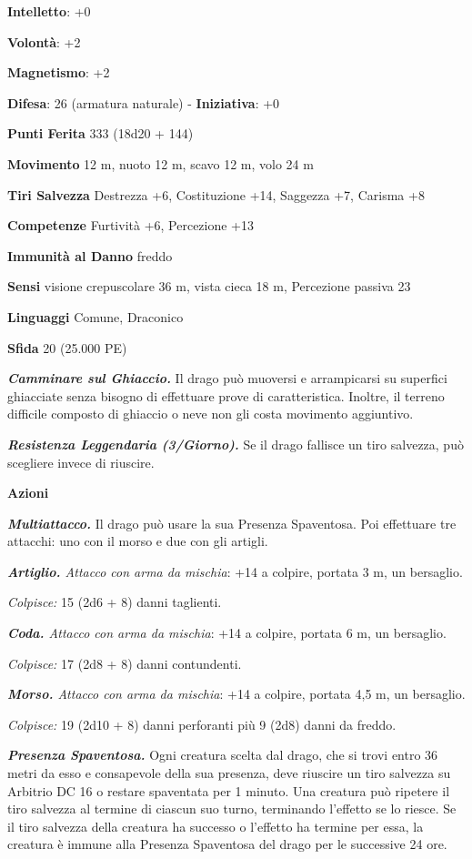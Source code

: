 \begin{multicols}{2}
\textbf{Intelletto}: +0

\textbf{Volontà}: +2

\textbf{Magnetismo}: +2

\textbf{Difesa}: 26 (armatura naturale) - \textbf{Iniziativa}: +0

\textbf{Punti Ferita} 333 (18d20 + 144)

\textbf{Movimento} 12 m, nuoto 12 m, scavo 12 m, volo 24 m

\textbf{Tiri Salvezza} Destrezza +6, Costituzione +14, Saggezza +7,
Carisma +8

\textbf{Competenze} Furtività +6, Percezione +13

\textbf{Immunità al Danno} freddo

\textbf{Sensi} visione crepuscolare 36 m, vista cieca 18 m, Percezione passiva
23

\textbf{Linguaggi} Comune, Draconico

\textbf{Sfida} 20 (25.000 PE)

\emph{\textbf{Camminare sul Ghiaccio.}} Il drago può muoversi e
arrampicarsi su superfici ghiacciate senza bisogno di effettuare prove
di caratteristica. Inoltre, il terreno difficile composto di ghiaccio o
neve non gli costa movimento aggiuntivo.

\emph{\textbf{Resistenza Leggendaria (3/Giorno).}} Se il drago fallisce
un tiro salvezza, può scegliere invece di riuscire.

\textbf{Azioni}

\emph{\textbf{Multiattacco.}} Il drago può usare la sua Presenza
Spaventosa. Poi effettuare tre attacchi: uno con il morso e due con gli
artigli.

\emph{\textbf{Artiglio.} Attacco con arma da mischia}: +14 a colpire,
portata 3 m, un bersaglio.

\emph{Colpisce:} 15 (2d6 + 8) danni taglienti.

\emph{\textbf{Coda.} Attacco con arma da mischia}: +14 a colpire,
portata 6 m, un bersaglio.

\emph{Colpisce:} 17 (2d8 + 8) danni contundenti.

\emph{\textbf{Morso.} Attacco con arma da mischia}: +14 a colpire,
portata 4,5 m, un bersaglio.

\emph{Colpisce:} 19 (2d10 + 8) danni perforanti più 9 (2d8) danni da
freddo.

\emph{\textbf{Presenza Spaventosa.}} Ogni creatura scelta dal drago, che
si trovi entro 36 metri da esso e consapevole della sua presenza, deve
riuscire un tiro salvezza su Arbitrio DC 16 o restare spaventata per 1
minuto. Una creatura può ripetere il tiro salvezza al termine di ciascun
suo turno, terminando l'effetto se lo riesce. Se il tiro salvezza della
creatura ha successo o l'effetto ha termine per essa, la creatura è
immune alla Presenza Spaventosa del drago per le successive 24 ore.


\end{multicols}
